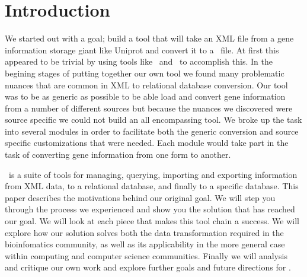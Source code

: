 \section{Introduction}
We started out with a goal; build a tool that will take an XML file from a gene information storage giant like Uniprot and convert it to a \genmapp~file. At first this appeared to be trivial by using tools like ~and \hibernate~to accomplish this. In the begining stages of putting together our own tool we found many problematic nuances that are common in XML to relational database conversion. Our tool was to be as generic as possible to be able load and convert gene information from a number of different sources but because the nuances we discovered were source specific we could not build an all encompassing tool. We broke up the task into several modules in order to facilitate both the generic conversion and source specific customizations that were needed.  Each module would take part in the task of converting gene information from one form to another.

\xmlpipedb~is a suite of tools for managing, querying, importing and exporting information from XML data, to a relational database, and finally to a \genmapp specific database. This paper describes the motivations behind our original goal.  We will step you through the process we experienced and show you the solution that has reached our goal. We will look at each piece that makes this tool chain a success.  We will explore how our solution solves both the data transformation required in the bioinfomatics community, as well as its applicability in the more general case within computing and computer science communities.  Finally we will analysis and critique our own work and explore further goals and future directions for \xmlpipedb.
